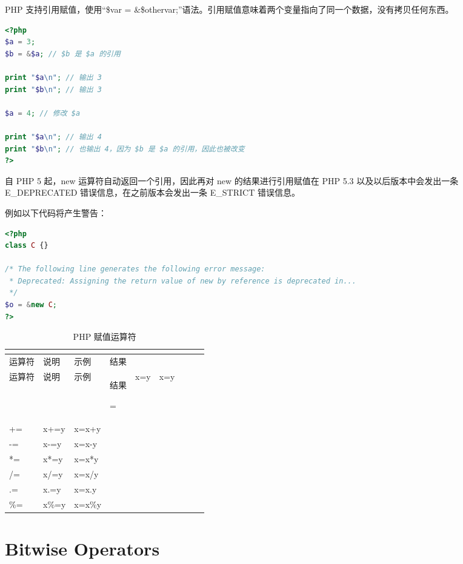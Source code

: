 PHP 支持引用赋值，使用“\$var = \&\$othervar;”语法。引用赋值意味着两个变量指向了同一个数据，没有拷贝任何东西。

\begin{lstlisting}[language=PHP]
<?php
$a = 3;
$b = &$a; // $b 是 $a 的引用

print "$a\n"; // 输出 3
print "$b\n"; // 输出 3

$a = 4; // 修改 $a

print "$a\n"; // 输出 4
print "$b\n"; // 也输出 4，因为 $b 是 $a 的引用，因此也被改变
?>
\end{lstlisting}

自 PHP 5 起，new 运算符自动返回一个引用，因此再对 new 的结果进行引用赋值在 PHP 5.3 以及以后版本中会发出一条 E\_DEPRECATED 错误信息，在之前版本会发出一条 E\_STRICT 错误信息。

例如以下代码将产生警告：

\begin{lstlisting}[language=PHP]
<?php
class C {}

/* The following line generates the following error message:
 * Deprecated: Assigning the return value of new by reference is deprecated in...
 */
$o = &new C;
?>
\end{lstlisting}

\begin{longtable}{|m{35pt}|m{180pt}|m{80pt}|m{30pt}|}
\tabularnewline\hline
运算符	&说明	&示例	&结果
\endhead

\caption{PHP 赋值运算符}\\
\hline
运算符	&说明	&示例	&结果
\endfirsthead

\endfoot

\endlastfoot
\hline
=		&x=y		&x=y&\\
\hline
+\/=	&x+\/=y	&x=x+y&\\
\hline
-\/=		&x-\/=y		&x=x-y&\\
\hline
*\/=	&x*\/=y	&x=x*y&\\
\hline
/\/=		&x/\/=y		&x=x/y&\\
\hline
.\/=		&x.\/=y		&x=x.y&\\
\hline
\%\/=	&x\%\/=y	&x=x\%y&\\
\hline
\end{longtable}

\section{Bitwise Operators}

